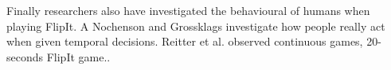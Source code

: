 \documentclass[journal,a4paper]{IEEEtran}
\begin{document}
Finally researchers also have investigated the behavioural of humans when playing FlipIt. A Nochenson and Grossklags \cite{nochenson2013behavioral}  investigate how people really act when given temporal decisions. Reitter et al. \cite{reitter2013risk} observed continuous games, 20-seconds FlipIt game..



\end{document}
